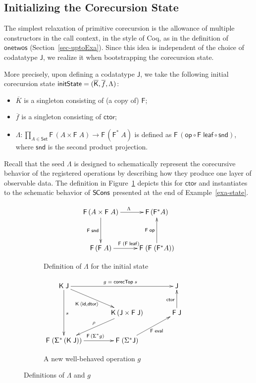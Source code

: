 \documentclass[preprint,draft]
{sigplanconf}
\newcommand\TC{\mathsf}
\newcommand{\ov}{\overline}
\newcommand{\ra}{\rightarrow}
\newcommand{\<}{\langle}
\renewcommand{\>}{\rangle}
\renewcommand{\l}{\Lambda}
\newcommand{\talg}{{{\mathsf{op}}}}
\renewcommand{\eta}{{{\mathsf{leaf}}}}
\newcommand{\ctor}{{{\mathsf{ctor}}}}
\newcommand{\dtor}{{{\mathsf{dtor}}}}
\newcommand{\initState}{{{\mathsf{init\hspace*{-0.075ex}State}}}}
\newcommand{\onetwos}{{{\mathsf{onetwos}}}}
\newcommand{\eval}{{{\mathsf{eval}}}}
\newcommand\corecU{\mathsf{corecTop}}
\newcommand{\SCons}{{{\mathsf{S\hspace*{-0.2ex}Cons}}}}
\newcommand{\id}{\mathsf{{id}}}
\newcommand{\F}{{\TC{F}}}
\newcommand{\J}{{\TC{J}}}
\renewcommand{\SS}{{\TC{\Sigma}}}
\newcommand{\K}{{\TC{K}}}
\newcommand{\snd}{\mathsf{{snd}}}
\newcommand\Set{\TC{Set}}
\def\S{Section~}
\begin{document}
\subsection{Initializing the Corecursion State}
\label{sec-init}

The simplest relaxation of primitive corecursion
is the allowance of multiple constructors in the call context,
in the style of Coq,
as in the definition of $\onetwos$ (\S\ref{sec-uptoExa}).
Since this idea is independent of the choice of
codatatype $\J$, we realize it when bootstrapping the corecursion state.

More precisely, upon defining a codatatype $\J$, we take the following initial corecursion state $\initState = (\ov{\K},\ov{f},\l)$:
\begin{itemize}
\item $\ov{K}$ is a singleton consisting of (a copy of) $\F$; \item $\ov{f}$ is a singleton consisting of $\ctor$;
\item $\l : \prod_{A \in \Set} \F\,(A \times \F\;A) \ra \F\,(\F^*\;A)$ is defined as $\F\,(\talg \mathrel\circ \F\;\eta \mathrel\circ \snd)$,
where $\snd$ is the second product projection. \end{itemize}
Recall that the seed $\l$ is designed to
schematically represent the corecursive behavior of the registered
operations by describing how they produce one layer of observable data.
The definition in Figure~\ref{fig-init} depicts this for $\ctor$
and instantiates to the schematic behavior of $\SCons$ presented at the end of Example~\ref{exa-state}.


\begin{figure*}[t]\centering
\hspace*{-5em}
\begin{subfigure}[b]{0.4\textwidth}
$$
\xymatrix@C=2pc@R=3pc{
 \F\,(A \times \F\;A)
\ar^{\l}[r]
\ar_{\F\;\snd}[d]    &  \F\,(\F^*A)
                   \\
\F\,(\F\;A)
\ar^{\F\;(\F\;\eta)}[r]  &  \F\;(\F\;(\F^*A)) \ar^{\F\;\talg}[u]
}
$$
\vspace*{-1ex} \caption{Definition of $\l$ for the initial state} \label{fig-init}
\end{subfigure}\quad
\begin{subfigure}[b]{0.4\textwidth}
\centering
$\xymatrix@C=3pc@R=2pc{
 \K\;\J \ar^{s}[dd] \ar^{g \;=\; \corecU\;s}[rr]\ar_{\K\,\langle\id, \dtor\rangle\,\,\,\,}[dr]    & &  \J
\\
 & \K\,(\J \times \F\;\J) \ar_{\rho}[dl]           & \F\;\J \ar^{\ctor}[u]
\\
  \F\;({\SS}^*\,(\K\;\J))\ar^{\F\,(\SS^* g)}[r]     & \F\;({\Sigma}^*\J) \ar_{\F\;\eval}[ur]  &
}$
\caption{A new well-behaved operation $g$}
\label{fig-integg}
\end{subfigure}
\caption{Definitions of $\l$ and $g$}
\label{fig-init-integg}
\end{figure*}
\end{document}
